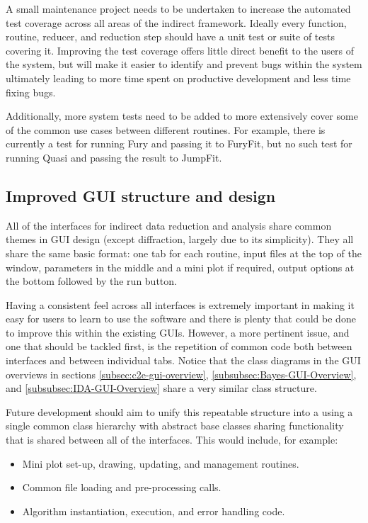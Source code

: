 \documentclass[paper=a4, fontsize=11pt]{scrartcl}	%
\numberwithin{equation}{section}															%
\numberwithin{figure}{section}																%
\numberwithin{table}{section}																%
\begin{document}
A small maintenance project needs to be undertaken to increase the automated test coverage across all areas of the indirect framework. Ideally every function, routine, reducer, and reduction step should have a unit test or suite of tests covering it. Improving the test coverage offers little direct benefit to the users of the system, but will make it easier to identify and prevent bugs within the system ultimately leading to more time spent on productive development and less time fixing bugs.

Additionally, more system tests need to be added to more extensively cover some of the  common use cases between different routines. For example, there is currently a test for running Fury and passing it to FuryFit, but no such test for running Quasi and passing the result to JumpFit.

\subsection{Improved GUI structure and design}
\label{subsec:GUI-Improvements}
All of the interfaces for indirect data reduction and analysis share common themes in GUI design (except diffraction, largely due to its simplicity). They all share the same basic format: one tab for each routine, input files at the top of the window, parameters in the middle and a mini plot if required, output options at the bottom followed by the run button.

Having a consistent feel across all interfaces is extremely important in making it easy for users to learn to use the software and there is plenty that could be done to improve this within the existing GUIs. However, a more pertinent issue, and one that should be tackled first, is the repetition of common code both between interfaces and between individual tabs. Notice that the class diagrams in the GUI overviews in sections \ref{subsec:c2e-gui-overview}, \ref{subsubsec:Bayes-GUI-Overview}, and \ref{subsubsec:IDA-GUI-Overview} share a very similar class structure.

Future development should aim to unify this repeatable structure into a using a single common class hierarchy with abstract base classes sharing functionality that is shared between all of the interfaces. This would include, for example:

\begin{itemize}
\item Mini plot set-up, drawing, updating, and management routines.
\item Common file loading and pre-processing calls.
\item Algorithm instantiation, execution, and error handling code.
\end{itemize}
\end{document}
